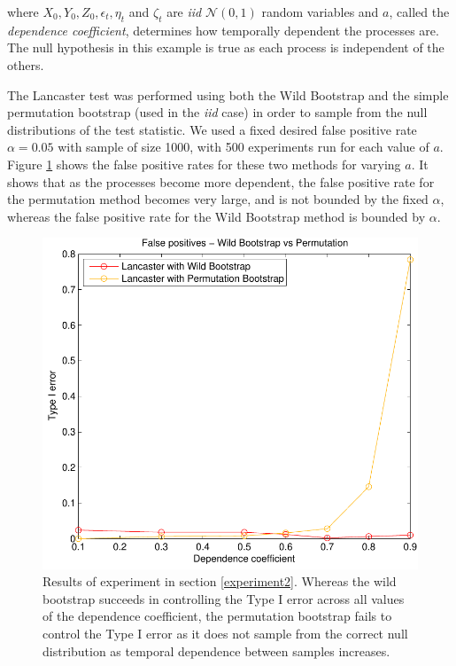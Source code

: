 \documentclass[]{article}
\begin{document}
where $X_0, Y_0, Z_0, \epsilon_t, \eta_t$ and $\zeta_t$ are \emph{iid} $\mathcal{N}(0,1)$ random variables and $a$, called the \emph{dependence coefficient}, determines how temporally dependent the processes are. The null hypothesis in this example is true as each process is independent of the others.

The Lancaster test was performed using both the Wild Bootstrap and the simple permutation bootstrap (used in the \emph{iid} case) in order to sample from the null distributions of the test statistic. We used a fixed desired false positive rate $\alpha = 0.05$ with sample of size 1000, with 500 experiments run for each value of $a$. Figure \ref{wildBootstrap_is_necessary} shows the false positive rates for these two methods for varying $a$. It shows that as the processes become more dependent, the false positive rate for the permutation method becomes very large, and is not bounded by the fixed $\alpha$, whereas the false positive rate for the Wild Bootstrap method is bounded by $\alpha$.


\begin{figure}[ht]
\vskip 0.2in
\begin{center}
\centerline{\includegraphics[scale=0.6]{ICML_figure2.pdf}}
\caption{Results of experiment in section \ref{experiment2}. Whereas the wild bootstrap succeeds in controlling the Type I error across all values of the dependence coefficient, the permutation bootstrap fails to control the Type I error as it does not sample from the correct null distribution as temporal dependence between samples increases.}
\label{wildBootstrap_is_necessary}
\end{center}
\vskip -0.2in
\end{figure} 
\end{document}
